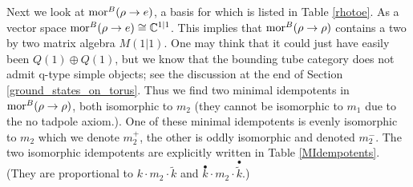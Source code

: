 Next we look at $\text{mor}^B(\rho \to e)$, 
a basis for which is listed in Table \ref{rhotoe}. 
As a vector space $\text{mor}^B(\rho \to e ) \cong \mathbb{C}^{1|1}$. 
This implies that $\text{mor}^B(\rho \to \rho)$ contains a two by two matrix algebra $M(1|1)$.
One may think that it could just have easily been $Q(1)\oplus Q(1)$, 
but we know that the bounding tube category does not admit q-type simple objects; see the discussion at the end of Section \ref{ground_states_on_torus}.
Thus we find two minimal idempotents in $\text{mor}^B(\rho \to \rho)$, both isomorphic to $m_2$ (they cannot be isomorphic to $m_1$ due to the no tadpole axiom.).
One of these minimal idempotents is evenly isomorphic to $m_2$ which we denote $m_2^+$, the other is oddly isomorphic and denoted $m_2^-$.
The two isomorphic idempotents are explicitly written in Table \ref{MIdempotents}.
(They are proportional to $k \cdot m_2\cdot  \tilde{k}$ and $\overset{\bullet}{k} \cdot m_2 \cdot \overset{\bullet}{\tilde{k}}$.)


